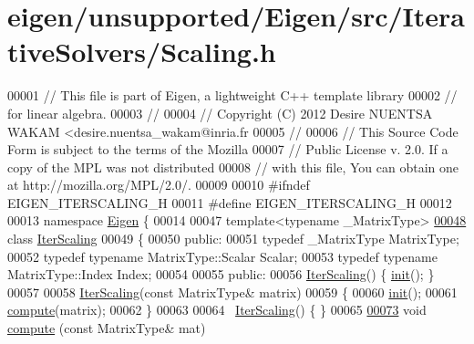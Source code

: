 \hypertarget{eigen_2unsupported_2_eigen_2src_2_iterative_solvers_2_scaling_8h_source}{}\section{eigen/unsupported/\+Eigen/src/\+Iterative\+Solvers/\+Scaling.h}
\label{eigen_2unsupported_2_eigen_2src_2_iterative_solvers_2_scaling_8h_source}

\begin{DoxyCode}
00001 \textcolor{comment}{// This file is part of Eigen, a lightweight C++ template library}
00002 \textcolor{comment}{// for linear algebra.}
00003 \textcolor{comment}{//}
00004 \textcolor{comment}{// Copyright (C) 2012 Desire NUENTSA WAKAM <desire.nuentsa\_wakam@inria.fr}
00005 \textcolor{comment}{//}
00006 \textcolor{comment}{// This Source Code Form is subject to the terms of the Mozilla}
00007 \textcolor{comment}{// Public License v. 2.0. If a copy of the MPL was not distributed}
00008 \textcolor{comment}{// with this file, You can obtain one at http://mozilla.org/MPL/2.0/.}
00009 
00010 \textcolor{preprocessor}{#ifndef EIGEN\_ITERSCALING\_H}
00011 \textcolor{preprocessor}{#define EIGEN\_ITERSCALING\_H}
00012 
00013 \textcolor{keyword}{namespace }\hyperlink{namespace_eigen}{Eigen} \{
00014 
00047 \textcolor{keyword}{template}<\textcolor{keyword}{typename} \_MatrixType>
\hyperlink{class_eigen_1_1_iter_scaling}{00048} \textcolor{keyword}{class }\hyperlink{class_eigen_1_1_iter_scaling}{IterScaling}
00049 \{
00050   \textcolor{keyword}{public}:
00051     \textcolor{keyword}{typedef} \_MatrixType MatrixType; 
00052     \textcolor{keyword}{typedef} \textcolor{keyword}{typename} MatrixType::Scalar Scalar;
00053     \textcolor{keyword}{typedef} \textcolor{keyword}{typename} MatrixType::Index Index;
00054     
00055   \textcolor{keyword}{public}:
00056     \hyperlink{class_eigen_1_1_iter_scaling}{IterScaling}() \{ \hyperlink{structinit}{init}(); \}
00057     
00058     \hyperlink{class_eigen_1_1_iter_scaling}{IterScaling}(\textcolor{keyword}{const} MatrixType& matrix)
00059     \{
00060       \hyperlink{structinit}{init}();
00061       \hyperlink{class_eigen_1_1_iter_scaling_a6a76754399fd004b3ac6011e272ffb71}{compute}(matrix);
00062     \}
00063     
00064     ~\hyperlink{class_eigen_1_1_iter_scaling}{IterScaling}() \{ \}
00065     
\hyperlink{class_eigen_1_1_iter_scaling_a6a76754399fd004b3ac6011e272ffb71}{00073}     \textcolor{keywordtype}{void} \hyperlink{class_eigen_1_1_iter_scaling_a6a76754399fd004b3ac6011e272ffb71}{compute} (\textcolor{keyword}{const} MatrixType& mat)

\end{DoxyCode}
